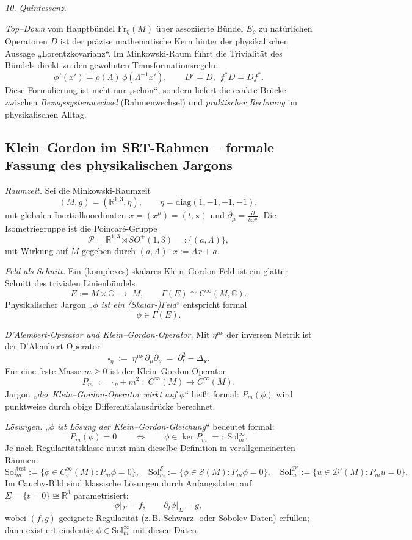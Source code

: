 \documentclass[10pt, letterpaper]{article}
\newcommand{\R}{\mathbb{R}}
\newcommand{\C}{\mathbb{C}}
\begin{document}
\bigskip
\emph{10. Quintessenz.}

\emph{Top–Down} vom Hauptbündel $\mathrm{Fr}_\eta(M)$ über assoziierte Bündel $E_\rho$
zu natürlichen Operatoren $D$ ist der präzise mathematische Kern hinter der
physikalischen Aussage „Lorentzkovarianz“. Im Minkowski-Raum führt die
Trivialität des Bündels direkt zu den gewohnten Transformationsregeln:
\[
\boxed{\ \phi'(x')=\rho(\Lambda)\,\phi(\Lambda^{-1}x'),\qquad
D' = D,\ \ f^*D=Df^*.\ }
\]
Diese Formulierung ist nicht nur „schön“, sondern liefert die exakte Brücke
zwischen \emph{Bezugssystemwechsel} (Rahmenwechsel) und \emph{praktischer
Rechnung} im physikalischen Alltag.



\subsection*{Klein–Gordon im SRT-Rahmen – formale Fassung des physikalischen Jargons}

\emph{Raumzeit.}
Sei die Minkowski-Raumzeit
\[
(M,g)=(\R^{1,3},\eta),\qquad 
\eta=\mathrm{diag}(1,-1,-1,-1),
\]
mit globalen Inertialkoordinaten $x=(x^\mu)=(t,\mathbf x)$ und $\partial_\mu=\frac{\partial}{\partial x^\mu}$.
Die Isometriegruppe ist die Poincaré-Gruppe
\[
\mathcal P=\R^{1,3}\rtimes SO^+(1,3)=:\{(a,\Lambda)\},
\]
mit Wirkung auf $M$ gegeben durch $(a,\Lambda)\cdot x := \Lambda x + a$.

\emph{Feld als Schnitt.}
Ein (komplexes) skalares Klein–Gordon-Feld ist ein glatter Schnitt des trivialen Linienbündels
\[
E:=M\times\C \;\longrightarrow\; M,\qquad 
\Gamma(E)\cong C^\infty(M,\C).
\]
Physikalischer Jargon „\emph{$\phi$ ist ein (Skalar-)Feld}“ entspricht formal
\[
\phi\in \Gamma(E).
\]

\emph{D’Alembert-Operator und Klein–Gordon-Operator.}
Mit $\eta^{\mu\nu}$ der inversen Metrik ist der D’Alembert-Operator
\[
\square_\eta \;:=\; \eta^{\mu\nu}\,\partial_\mu\partial_\nu \;=\; \partial_t^2-\Delta_{\mathbf x}.
\]
Für eine feste Masse $m\ge 0$ ist der Klein–Gordon-Operator
\[
P_m \;:=\; \square_\eta + m^2 \;:\; C^\infty(M)\longrightarrow C^\infty(M).
\]
Jargon „\emph{der Klein–Gordon-Operator wirkt auf $\phi$}“ heißt formal: $P_m(\phi)$ wird punktweise
durch obige Differentialausdrücke berechnet.

\emph{Lösungen.}
„\emph{$\phi$ ist Lösung der Klein–Gordon-Gleichung}“ bedeutet formal:
\[
P_m(\phi)=0\qquad\Longleftrightarrow\qquad \phi\in\ker P_m \;=:\; \mathrm{Sol}_m^{\infty}.
\]
Je nach Regularitätsklasse nutzt man dieselbe Definition in verallgemeinerten Räumen:
\[
\mathrm{Sol}_m^{\mathrm{test}}:=\{\phi\in C_c^\infty(M):P_m\phi=0\},\quad
\mathrm{Sol}_m^{\mathcal S}:=\{\phi\in\mathcal S(M):P_m\phi=0\},\quad
\mathrm{Sol}_m^{\mathcal D'}:=\{u\in\mathcal D'(M):P_m u=0\}.
\]
Im Cauchy-Bild sind klassische Lösungen durch Anfangsdaten auf $\Sigma=\{t=0\}\cong\R^3$ parametrisiert:
\[
\phi|_\Sigma=f,\qquad \partial_t\phi|_\Sigma=g,
\]
wobei $(f,g)$ geeignete Regularität (z.\,B. Schwarz- oder Sobolev-Daten) erfüllen; dann existiert eindeutig
$\phi\in \mathrm{Sol}_m^{\infty}$ mit diesen Daten.
\end{document}
